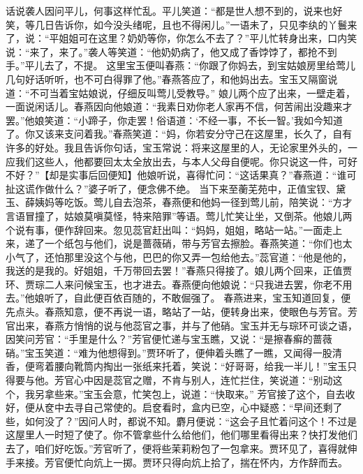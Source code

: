 \documentclass[12pt,oneside]{book}
\begin{document}
话说袭人因问平儿，何事这样忙乱。平儿笑道：“都是世人想不到的，说来也好笑，等几日告诉你，如今没头绪呢，且也不得闲儿。”一语未了，只见李纨的丫鬟来了，说：“平姐姐可在这里？奶奶等你，你怎么不去了？”平儿忙转身出来，口内笑说：“来了，来了。”袭人等笑道：“他奶奶病了，他又成了香饽饽了，都抢不到手。”平儿去了，不提。
这里宝玉便叫春燕：“你跟了你妈去，到宝姑娘房里给莺儿几句好话听听，也不可白得罪了他。”春燕答应了，和他妈出去。宝玉又隔窗说道：“不可当着宝姑娘说，仔细反叫莺儿受教导。”
娘儿两个应了出来，一壁走着，一面说闲话儿。春燕因向他娘道：“我素日劝你老人家再不信，何苦闹出没趣来才罢。”他娘笑道：“小蹄子，你走罢！俗语道：‘不经一事，不长一智。’我如今知道了。你又该来支问着我。”春燕笑道：“妈，你若安分守己在这屋里，长久了，自有许多的好处。我且告诉你句话，宝玉常说：将来这屋里的人，无论家里外头的，一应我们这些人，他都要回太太全放出去，与本人父母自便呢。你只说这一件，可好不好？”【却是实事后回便知】他娘听说，喜得忙问：“这话果真？”春燕道：“谁可扯这谎作做什么？”婆子听了，便念佛不绝。
当下来至蘅芜苑中，正值宝钗、黛玉、薛姨妈等吃饭。莺儿自去泡茶，春燕便和他妈一径到莺儿前，陪笑说：“方才言语冒撞了，姑娘莫嗔莫怪，特来陪罪”等语。莺儿忙笑让坐，又倒茶。他娘儿两个说有事，便作辞回来。忽见蕊官赶出叫：“妈妈，姐姐，略站一站。”一面走上来，递了一个纸包与他们，说是蔷薇硝，带与芳官去擦脸。春燕笑道：“你们也太小气了，还怕那里没这个与他，巴巴的你又弄一包给他去。”蕊官道：“他是他的，我送的是我的。好姐姐，千万带回去罢！”春燕只得接了。娘儿两个回来，正值贾环、贾琮二人来问候宝玉，也才进去。春燕便向他娘说：“只我进去罢，你老不用去。”他娘听了，自此便百依百随的，不敢倔强了。
春燕进来，宝玉知道回复，便先点头。春燕知意，便不再说一语，略站了一站，便转身出来，使眼色与芳官。芳官出来，春燕方悄悄的说与他蕊官之事，并与了他硝。宝玉并无与琮环可谈之语，因笑问芳官：“手里是什么？”芳官便忙递与宝玉瞧，又说：“是擦春癣的蔷薇硝。”宝玉笑道：“难为他想得到。”贾环听了，便伸着头瞧了一瞧，又闻得一股清香，便弯着腰向靴筒内掏出一张纸来托着，笑说：“好哥哥，给我一半儿！”宝玉只得要与他。芳官心中因是蕊官之赠，不肯与别人，连忙拦住，笑说道：“别动这个，我另拿些来。”宝玉会意，忙笑包上，说道：“快取来。”
芳官接了这个，自去收好，便从奁中去寻自己常使的。启奁看时，盒内已空，心中疑惑：“早间还剩了些，如何没了？”因问人时，都说不知。麝月便说：“这会子且忙着问这个！不过是这屋里人一时短了使了。你不管拿些什么给他们，他们哪里看得出来？快打发他们去了，咱们好吃饭。”芳官听了，便将些茉莉粉包了一包拿来。贾环见了，喜得就伸手来接。芳官便忙向炕上一掷。贾环只得向炕上拾了，揣在怀内，方作辞而去。
\end{document}
